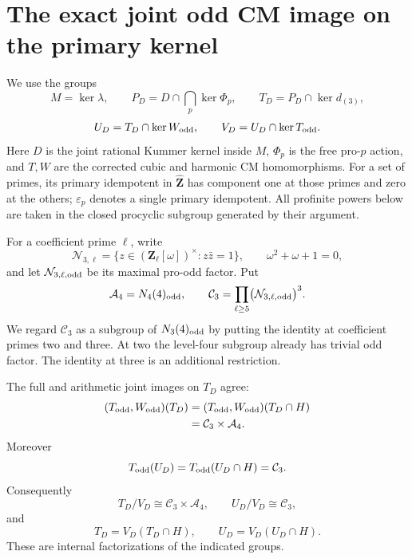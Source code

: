 \section{The exact joint odd CM image on the primary kernel}
\label{sec:exact-joint-odd-cm-image}

We use the groups
\[
 M=\ker\lambda,\qquad
 P_D=D\cap\bigcap_p\ker\Phi_p,\qquad
 T_D=P_D\cap\ker d_{(3)},
\]
\[
 U_D=T_D\cap\ker W_{\rm odd},\qquad
 V_D=U_D\cap\ker T_{\rm odd}.
\]
Here \(D\) is the joint rational Kummer kernel inside \(M\),
\(\Phi_p\) is the free pro-\(p\) action, and
\(T,W\) are the corrected cubic and harmonic CM homomorphisms.
For a set of primes, its primary idempotent in
\(\widehat{\mathbf Z}\) has component one at those primes
and zero at the others; \(\varepsilon_p\) denotes a single
primary idempotent. All profinite powers below are taken
in the closed procyclic subgroup generated by their argument.

For a coefficient prime \(\ell\), write
\[
 \mathcal N_{3,\ell}
  =\{z\in(\mathbf Z_\ell[\omega])^\times:z\bar z=1\},
 \qquad \omega^2+\omega+1=0,
\]
and let \(\mathcal N_{3,\ell,\rm odd}\) be its maximal
pro-odd factor. Put
\begin{equation}\label{eq:exact-joint-odd-1}
\mathcal A_4=N_4(4)_{\rm odd},\qquad
 \mathcal C_3=
 \prod_{\ell\ge5}\bigl(\mathcal N_{3,\ell,\rm odd}\bigr)^3.
\end{equation}
We regard \(\mathcal C_3\) as a subgroup of \(N_3(4)_{\rm odd}\)
by putting the identity at coefficient primes two and three.
At two the level-four subgroup already has trivial odd factor.
The identity at three is an additional restriction.

\begin{theorem}\label{thm:exact-joint-odd-cm-image}
The full and arithmetic joint images on \(T_D\) agree:
\begin{equation}\label{eq:exact-joint-odd-2}
\begin{split}
 (T_{\rm odd},W_{\rm odd})(T_D)
   &=(T_{\rm odd},W_{\rm odd})(T_D\cap H)\\
   &=\mathcal C_3\times\mathcal A_4.
 \end{split}
\end{equation}
Moreover
\begin{equation}\label{eq:exact-joint-odd-3}
T_{\rm odd}(U_D)=T_{\rm odd}(U_D\cap H)=\mathcal C_3.
\end{equation}
Consequently
\begin{equation}\label{eq:exact-joint-odd-4}
T_D/V_D\cong\mathcal C_3\times\mathcal A_4,\qquad
 U_D/V_D\cong\mathcal C_3,
\end{equation}
and
\begin{equation}\label{eq:exact-joint-odd-5}
T_D=V_D(T_D\cap H),\qquad
 U_D=V_D(U_D\cap H).
\end{equation}
These are internal factorizations of the indicated groups.
\end{theorem}

